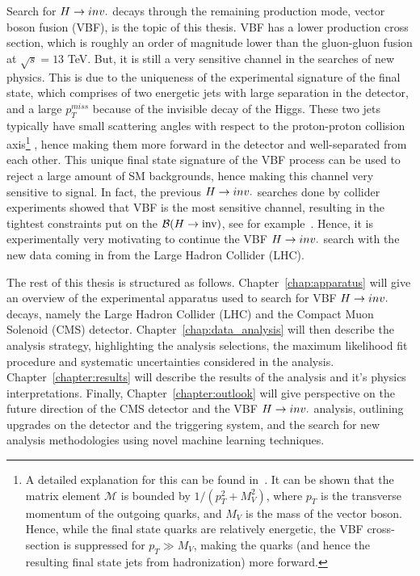 Search for $H \rightarrow inv.$ decays through the remaining production mode, vector boson fusion (VBF), is the topic of this thesis.
VBF has a lower production cross section, which is roughly an order of magnitude lower than the gluon-gluon fusion at $\sqrt{s} = 13$ TeV. But, it is still
a very sensitive channel in the searches of new physics. This is due to the uniqueness of the experimental signature of the final state, which comprises of two energetic jets with large
separation in the detector, and a large $p_T^{miss}$ because of the invisible decay of the Higgs. These two jets typically have small scattering angles with respect to the proton-proton
collision axis\footnote{A detailed explanation for this can be found in~\cite{Djouadi:2005gi}. It can be shown that the matrix element $\mathcal{M}$ is bounded by $1 / (p_T^2 + M_V^2)$,
where $p_T$ is the transverse momentum of the outgoing quarks, and $M_V$ is the mass of the vector boson. Hence, while the final state quarks are relatively energetic, the VBF cross-section is
suppressed for $p_{T} \gg M_{V}$, making the quarks (and hence the resulting final state jets from hadronization) more forward.}
, hence making them more forward in the detector and well-separated from each other. This unique final state signature of the VBF process can be used to reject a large amount of
SM backgrounds, hence making this channel very sensitive to signal. In fact, the previous $H \rightarrow inv.$ searches done by collider experiments showed that VBF is the most sensitive channel, resulting
in the tightest constraints put on the ${\mathcal{B}(H\rightarrow\text{inv})}$, see for example~\cite{CMS:2018yfx}. Hence, it is experimentally very motivating to continue the VBF $H \rightarrow inv.$ search with the new data coming in from
the Large Hadron Collider (LHC).

The rest of this thesis is structured as follows. Chapter~\ref{chap:apparatus} will give an overview of the experimental apparatus used to search for VBF $H \rightarrow inv.$ decays, namely the Large
Hadron Collider (LHC) and the Compact Muon Solenoid (CMS) detector. Chapter~\ref{chap:data_analysis} will then describe the analysis strategy, highlighting the analysis selections, the maximum
likelihood fit procedure and systematic uncertainties considered in the analysis. Chapter~\ref{chapter:results} will describe the results of the analysis and it's physics interpretations. Finally,
Chapter~\ref{chapter:outlook} will give perspective on the future direction of the CMS detector and the VBF $H \rightarrow inv.$ analysis, outlining upgrades on the detector and the triggering system, and
the search for new analysis methodologies using novel machine learning techniques.